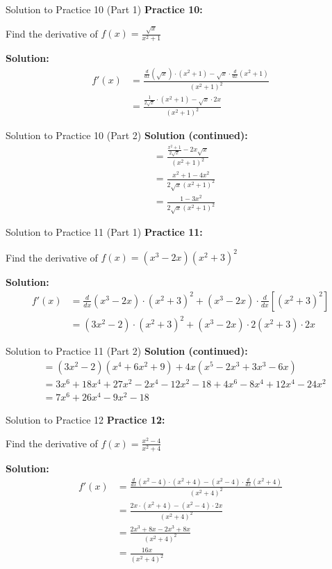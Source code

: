 \documentclass[aspectratio=169]{beamer}
\begin{document}
\begin{frame}{Solution to Practice 10 (Part 1)}
\textbf{Practice 10:}

Find the derivative of $f(x) = \frac{\sqrt{x}}{x^2 + 1}$

\textbf{Solution:}
\[
\begin{aligned}
  f'(x) &= \frac{\frac{d}{dx}(\sqrt{x}) \cdot (x^2 + 1) - \sqrt{x} \cdot \frac{d}{dx}(x^2 + 1)}{(x^2 + 1)^2} \\
  &= \frac{\frac{1}{2\sqrt{x}} \cdot (x^2 + 1) - \sqrt{x} \cdot 2x}{(x^2 + 1)^2}
\end{aligned}
\]
\end{frame}

\begin{frame}{Solution to Practice 10 (Part 2)}
\textbf{Solution (continued):}
\[
\begin{aligned}
  &= \frac{\frac{x^2 + 1}{2\sqrt{x}} - 2x\sqrt{x}}{(x^2 + 1)^2} \\
  &= \frac{x^2 + 1 - 4x^2}{2\sqrt{x}(x^2 + 1)^2} \\
  &= \frac{1 - 3x^2}{2\sqrt{x}(x^2 + 1)^2}
\end{aligned}
\]
\end{frame}

\begin{frame}{Solution to Practice 11 (Part 1)}
\textbf{Practice 11:}

Find the derivative of $f(x) = (x^3 - 2x)(x^2 + 3)^2$

\textbf{Solution:}
\[
\begin{aligned}
  f'(x) &= \frac{d}{dx}(x^3 - 2x) \cdot (x^2 + 3)^2 + (x^3 - 2x) \cdot \frac{d}{dx}[(x^2 + 3)^2] \\
  &= (3x^2 - 2) \cdot (x^2 + 3)^2 + (x^3 - 2x) \cdot 2(x^2 + 3) \cdot 2x
\end{aligned}
\]
\end{frame}

\begin{frame}{Solution to Practice 11 (Part 2)}
\textbf{Solution (continued):}
\[
\begin{aligned}
  &= (3x^2 - 2)(x^4 + 6x^2 + 9) + 4x(x^5 - 2x^3 + 3x^3 - 6x) \\
  &= 3x^6 + 18x^4 + 27x^2 - 2x^4 - 12x^2 - 18 + 4x^6 - 8x^4 + 12x^4 - 24x^2 \\
  &= 7x^6 + 26x^4 - 9x^2 - 18
\end{aligned}
\]
\end{frame}

\begin{frame}{Solution to Practice 12}
\textbf{Practice 12:}

Find the derivative of $f(x) = \frac{x^2 - 4}{x^2 + 4}$

\textbf{Solution:}
\[
\begin{aligned}
  f'(x) &= \frac{\frac{d}{dx}(x^2 - 4) \cdot (x^2 + 4) - (x^2 - 4) \cdot \frac{d}{dx}(x^2 + 4)}{(x^2 + 4)^2} \\
  &= \frac{2x \cdot (x^2 + 4) - (x^2 - 4) \cdot 2x}{(x^2 + 4)^2} \\
  &= \frac{2x^3 + 8x - 2x^3 + 8x}{(x^2 + 4)^2} \\
  &= \frac{16x}{(x^2 + 4)^2}
\end{aligned}
\]
\end{frame}
\end{document}
